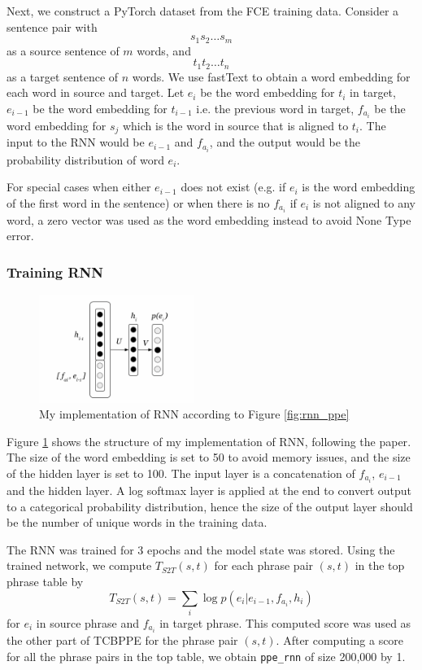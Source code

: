 \documentclass[12pt,a4paper,twoside,openright]{report}
\begin{document}
Next, we construct a PyTorch dataset from the FCE training data. Consider a sentence pair with 
\[s_1s_2\dots s_m\]
as a source sentence of $m$ words, and
\[t_1t_2\dots t_n\]
as a target sentence of $n$ words. We use fastText to obtain a word embedding for each word in source and target. Let $e_i$ be the word embedding for $t_i$ in target, $e_{i-1}$ be the word embedding for $t_{i-1}$ i.e. the previous word in target, $f_{a_i}$ be the word embedding for $s_j$ which is the word in source that is aligned to $t_i$. The input to the RNN would be $e_{i-1}$ and $f_{a_i}$, and the output would be the probability distribution of word $e_i$. 

For special cases when either $e_{i-1}$ does not exist (e.g. if $e_i$ is the word embedding of the first word in the sentence) or when there is no $f_{a_i}$ if $e_i$ is not aligned to any word, a zero vector was used as the word embedding instead to avoid None Type error.

\subsubsection{Training RNN}

\begin{figure}[ht]
\centering
\includegraphics[width=0.45\textwidth]{images/rnn_code.png}
\caption{My implementation of RNN according to Figure \ref{fig:rnn_ppe}}
\label{fig:rnn_code}
\end{figure}

Figure \ref{fig:rnn_code} shows the structure of my implementation of RNN, following the paper\cite{r2nn}. The size of the word embedding is set to 50 to avoid memory issues, and the size of the hidden layer is set to 100. The input layer is a concatenation of $f_{a_i}$, $e_{i-1}$ and the hidden layer. A log softmax layer is applied at the end to convert output to a categorical probability distribution, hence the size of the output layer should be the number of unique words in the training data.

The RNN was trained for 3 epochs and the model state was stored. Using the trained network, we compute $T_{S2T}(s, t)$ for each phrase pair $(s, t)$ in the top phrase table by
\[ T_{S2T}(s, t) = \sum_{i} \log p(e_i|e_{i-1}, f_{a_i}, h_i)\]
for $e_i$ in source phrase and $f_{a_i}$ in target phrase. This computed score was used as the other part of TCBPPE for the phrase pair $(s, t)$. After computing a score for all the phrase pairs in the top table, we obtain \texttt{ppe\_rnn} of size 200,000 by 1.
\end{document}

